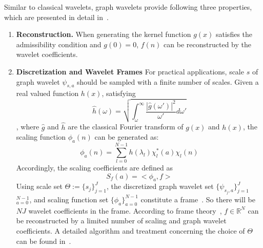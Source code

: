 Similar to classical wavelets, graph wavelets provide following three properties, which are presented in detail in~\cite{hammond2011wavelets}.
 \begin{enumerate}
 \item \textbf{Reconstruction.}
 When generating the kernel function $g(x)$ satisfies the admissibility condition and $g(0)=0$,  $f(n)$ can be reconstructed by the wavelet coefficients.
\item \textbf{Discretization and Wavelet Frames} For practical applications, scale $s$ of graph wavelet $\psi_{s,a}$ should be sampled with a finite number of scales. Given a real valued function $h(x)$, satisfying
\begin{equation}
\hat{h}(\omega) = \sqrt{\int_\omega^\infty\frac{|\hat{g}(\omega')|^2}{\omega'}d{\omega'} }
\end{equation}
, where $\hat{g}$ and $\hat{h}$ are the classical Fourier transform of $g(x)$ and $h(x)$, the scaling function $\phi_{a}(n)$ can be generated as:
\begin{equation}
\label{eq:graphscaledefinition}
\phi_{a}(n) = \sum\limits_{l=0}^{N-1}h(\lambda_l)\chi_l^*(a)\chi_l(n)
\end{equation}
Accordingly, the scaling coefficients are defined as
\begin{equation}
S_f(a)=<\phi_a,f>
\end{equation}
Using scale set $\Theta:=\{s_j\}_{j=1}^J$, the discretized graph wavelet set $\{\psi_{s_j,a}\}_{j=1}^{J}$ $_{a=0}^{N-1}$, and scaling function set $\{\phi_a\}_{a=0}^{N-1}$ constitute a frame~\cite{hammond2011wavelets}.
So there will be $NJ$ wavelet coefficients in the frame.
According to frame theory~\cite{daubechies1992ten}, $f\in \mathbb{R}^N$ can be reconstructed by a limited number of scaling and graph wavelet coefficients. A detailed algorithm and treatment concerning the choice of $\Theta$ can be found in~\cite{hammond2011wavelets}.



\end{enumerate}
